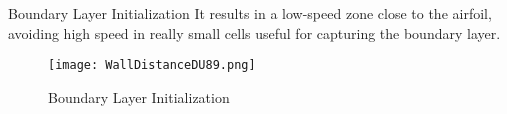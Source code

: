     \begin{frame}{Boundary Layer Initialization}
    It results in a low-speed zone close to the airfoil, avoiding high speed in really small cells useful for capturing the boundary layer.
    \begin{figure}
             \centering
             \texttt{[image: WallDistanceDU89.png]}
             \caption{Boundary Layer Initialization}
             \label{fig:wall-distance-init}
    \end{figure} 
    \end{frame}
    